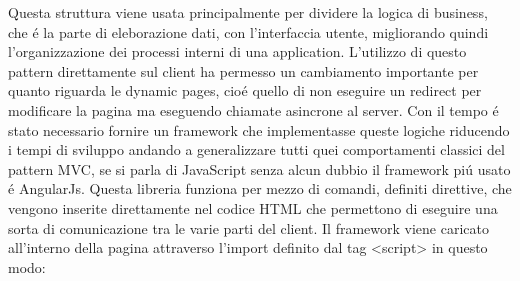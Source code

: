 Questa struttura viene usata principalmente per dividere la logica di business, che \'e la parte di eleborazione dati, con l'interfaccia utente, migliorando quindi l'organizzazione dei processi interni di una application. 
L'utilizzo di questo pattern direttamente sul client ha permesso un cambiamento importante per quanto riguarda le dynamic pages, cio\'e quello di non eseguire un redirect per modificare la pagina ma eseguendo chiamate asincrone al server. 
Con il tempo \'e stato necessario fornire un framework che implementasse queste logiche riducendo i tempi di sviluppo andando a generalizzare tutti quei comportamenti classici del pattern MVC, se si parla di JavaScript senza alcun dubbio il framework pi\'u usato \'e AngularJs.
Questa libreria funziona per mezzo di comandi, definiti direttive, che vengono inserite direttamente nel codice HTML che permettono di eseguire una sorta di comunicazione tra le varie parti del client. Il framework viene caricato all'interno della pagina attraverso l'import definito dal tag <script> in questo modo:
